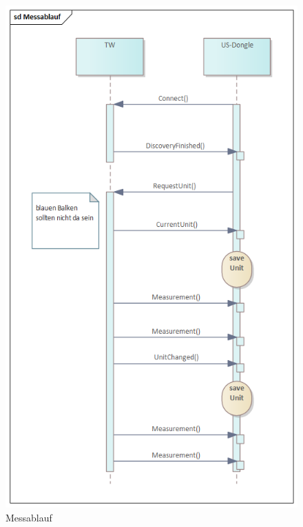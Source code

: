 \begin{figure}[H] 
	\centering
	\includegraphics[width=\textwidth]{figures/Messablauf.png}
	\caption{Messablauf}
\end{figure}